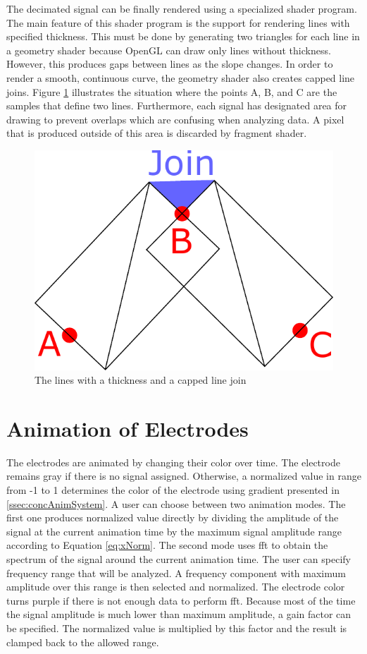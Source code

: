 The decimated signal can be finally rendered using a specialized shader program. The main feature of this shader program is the support for rendering lines with specified thickness. This must be done by generating two triangles for each line in a geometry shader because OpenGL can draw only lines without thickness. However, this produces gaps between lines as the slope changes. In order to render a smooth, continuous curve, the geometry shader also creates capped line joins. Figure \ref{fig:LinesAndJoin} illustrates the situation where the points A, B, and C are the samples that define two lines. Furthermore, each signal has designated area for drawing to prevent overlaps which are confusing when analyzing data. A pixel that is produced outside of this area is discarded by fragment shader.

\begin{figure}[htb]
	\centering
	\includegraphics[width=0.6\linewidth, height=0.2\textheight]{fig/linesAndJoin.pdf}
	\caption{The lines with a thickness and a capped line join}
	\label{fig:LinesAndJoin}
\end{figure}

\section{Animation of Electrodes}
\label{sec:animSystem}
The electrodes are animated by changing their color over time. The electrode remains gray if there is no signal assigned. Otherwise, a normalized value in range from -1 to 1 determines the color of the electrode using gradient presented in \ref{ssec:concAnimSystem}. A user can choose between two animation modes. The first one produces normalized value directly by dividing the amplitude of the signal at the current animation time by the maximum signal amplitude range according to Equation \ref{eq:xNorm}. The second mode uses \gls{fft} to obtain the spectrum of the signal around the current animation time. The user can specify frequency range that will be analyzed. A frequency component with maximum amplitude over this range is then selected and normalized. The electrode color turns purple if there is not enough data to perform \gls{fft}. Because most of the time the signal amplitude is much lower than maximum amplitude, a gain factor can be specified. The normalized value is multiplied by this factor and the result is clamped back to the allowed range.

